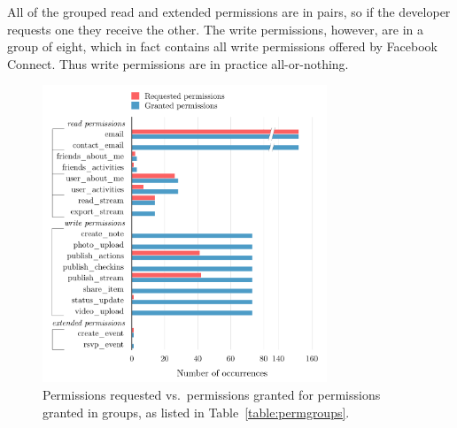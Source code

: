 \documentclass[10pt]{sig-alternate-10pt}
\begin{document}
All of the grouped read and extended permissions are in pairs, so if the developer requests one they receive the other.
The write permissions, however, are in a group of eight, which in fact contains all write permissions offered by Facebook Connect. Thus write permissions are in practice all-or-nothing.


\begin{figure}[h!]
  \centering
  \includegraphics[width=8.5cm]{scope_vs_html_cosn}
  \caption{Permissions requested vs.\ permissions granted for permissions granted in groups, as listed in Table~\ref{table:permgroups}.}
  \label{figure:scopevshtml}
\end{figure}
\end{document}
